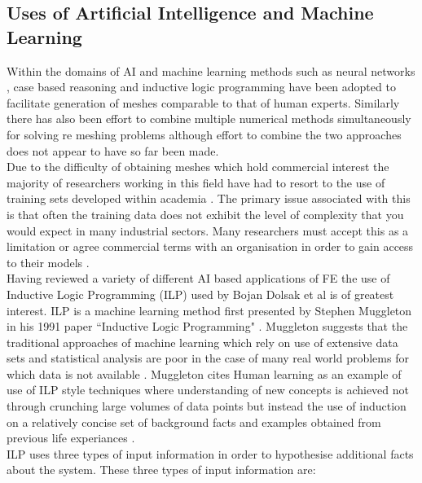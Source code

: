 \subsection{Uses of Artificial Intelligence and Machine Learning}

\noindent
Within the domains of AI and machine learning methods such as neural networks \cite{NeuralNetworks}, case based reasoning \cite{caseBasedReasoning} and inductive logic programming \cite{DolsakPaper94} have been adopted to facilitate generation of meshes comparable to that of human experts.  Similarly there has also been effort to combine multiple numerical methods simultaneously for solving re meshing problems \cite{TraditionalHybridRefinement} although effort to combine the two approaches does not appear to have so far been made.\\ 

\noindent
Due to the difficulty of obtaining meshes which hold commercial interest the majority of researchers working in this field have had to resort to the use of training sets developed within academia \cite{DolsakPaper91}. The primary issue associated with this is that often the training data does not exhibit the level of complexity that you would expect in many industrial sectors. Many researchers must accept this as a limitation or agree commercial terms with an organisation in order to gain access to their models \cite{DittmerMeshQualityMet}.\\ 

\noindent
Having reviewed a variety of different AI based applications of FE the use of Inductive Logic Programming (ILP) used by Bojan Dolsak et al is of greatest interest. ILP is a machine learning method first presented by Stephen Muggleton in his 1991 paper ``Inductive Logic Programming" \cite{MuggletonILP}. Muggleton suggests that the traditional approaches of machine learning which rely on use of extensive data sets and statistical analysis are poor in the case of many real world problems for which data is not available \cite{ILPYoutubeLecture}. Muggleton cites Human learning as an example of use of ILP style techniques where understanding of new concepts is achieved not through crunching large volumes of data points but instead  the use of induction on a relatively concise set of background facts and examples obtained from previous life experiances \cite{ILPYoutubeLecture}. \\ 

\noindent
ILP uses three types of input information in order to hypothesise additional facts about the system. These three types of input information are: \\ 

